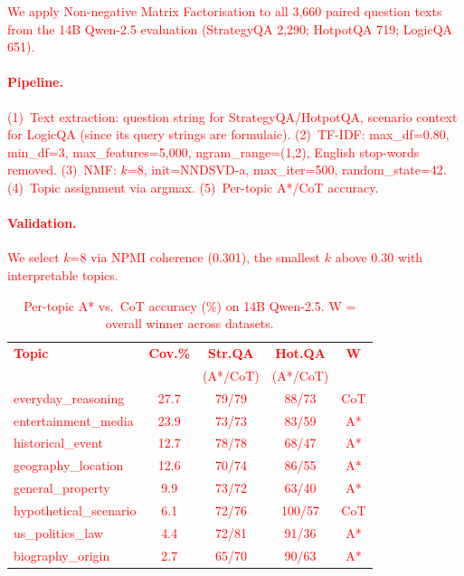 \documentclass[11pt]{article}
\begin{document}
\textcolor{red}{We apply Non-negative Matrix Factorisation \cite[NMF;][]{lee1999learning} to all 3,660 paired question texts from the 14B Qwen-2.5 evaluation (StrategyQA 2,290; HotpotQA 719; LogicQA 651).}

\textcolor{red}{\paragraph{Pipeline.} (1)~Text extraction: question string for StrategyQA/HotpotQA, scenario context for LogicQA (since its query strings are formulaic). (2)~TF-IDF: max\_df=0.80, min\_df=3, max\_features=5,000, ngram\_range=(1,2), English stop-words removed. (3)~NMF: $k$=8, init=NNDSVD-a, max\_iter=500, random\_state=42. (4)~Topic assignment via argmax. (5)~Per-topic A*/CoT accuracy.}

\textcolor{red}{\paragraph{Validation.} We select $k$=8 via NPMI coherence (0.301), the smallest $k$ above 0.30 with interpretable topics.}

\begin{table}[h]
\centering
\small
\textcolor{red}{
\setlength{\tabcolsep}{3pt}
\begin{tabular}{lcccc}
\toprule
\textbf{Topic} & \textbf{Cov.\%} & \textbf{Str.QA} & \textbf{Hot.QA} & \textbf{W} \\
& & (A*/CoT) & (A*/CoT) & \\
\midrule
everyday\_reasoning & 27.7 & 79/79 & 88/73 & CoT \\
entertainment\_media & 23.9 & 73/73 & 83/59 & A* \\
historical\_event & 12.7 & 78/78 & 68/47 & A* \\
geography\_location & 12.6 & 70/74 & 86/55 & A* \\
general\_property & 9.9 & 73/72 & 63/40 & A* \\
hypothetical\_scenario & 6.1 & 72/76 & 100/57 & CoT \\
us\_politics\_law & 4.4 & 72/81 & 91/36 & A* \\
biography\_origin & 2.7 & 65/70 & 90/63 & A* \\
\bottomrule
\end{tabular}}
\caption{\textcolor{red}{Per-topic A* vs.\ CoT accuracy (\%) on 14B Qwen-2.5. W = overall winner across datasets.}}
\label{tab:topic_results}
\end{table}
\end{document}
